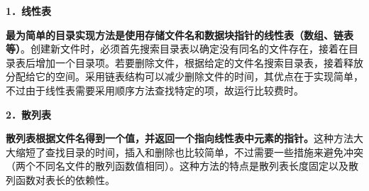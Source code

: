 \textbf{{1．线性表}}

\textbf{最为简单的目录实现方法是使用存储文件名和数据块指针的线性表（数组、链表等）}{。创建新文件时，必须首先搜索目录表以确定没有同名的文件存在，接着在目录表后增加一个目录项。若要删除文件，根据给定的文件名搜索目录表，接着释放分配给它的空间。采用链表结构可以减少删除文件的时间，其优点在于实现简单，不过由于线性表需要采用顺序方法查找特定的项，故运行比较费时。}

\textbf{{2．散列表}}

\textbf{散列表根据文件名得到一个值，并返回一个指向线性表中元素的指针。}这种方法大大缩短了查找目录的时间，插入和删除也比较简单，不过需要一些措施来避免冲突（两个不同名文件的散列函数值相同）。这种方法的特点是散列表长度固定以及散列函数对表长的依赖性。
